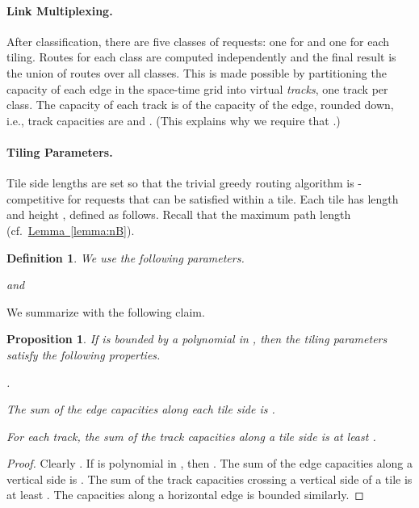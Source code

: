 \documentclass[11pt]{article}
\newtheorem{proposition}[theorem]{Proposition}
\newcommand{\namedref}[2]{\hyperref[#2]{#1~\ref*{#2}}}
\newcommand{\lemmaref}[1]{\namedref{Lemma}{#1}}
\newtheorem{defn}[theorem]{Definition}
\newenvironment{proof sketch}[1]{\noindent {\emph{Proof sketch of #1:}}}{\hfill \qed}
\newcommand{\near}{\text{\emph{Near}}\xspace}
\begin{document}
\paragraph{Link Multiplexing\ifnum{}.\fi}
After classification, there are five classes of
requests: one for \near and one for each tiling. Routes for each class
are computed independently and the final result is the union of routes
over all classes. This is made possible by partitioning the capacity
of each edge in the space-time
grid into virtual \emph{tracks}, one track per class.  The capacity of each
track is  of the capacity of the edge, rounded
down, i.e., track capacities are  and
{}.  (This explains why
we require that .)

\paragraph{Tiling Parameters\ifnum{}.\fi}
Tile side lengths are set so that the trivial greedy routing algorithm
is -competitive for requests that can be satisfied within a
tile. Each tile
has length  and height , defined as follows.
Recall that the maximum path length  (cf.~\lemmaref{lemma:nB}).
\begin{defn}\label{def:xy}
We use the following parameters.
\begin{compactitem}
\item 
\item  and 
\end{compactitem}
\end{defn}
\noindent
We summarize with the following claim.


\begin{proposition}\label{prop:tiling}
If  is bounded by a polynomial in , then the tiling parameters
satisfy the following properties.
  \begin{compactenum}
  \item .
  \item The sum of the edge capacities along each tile side is .
  \item For each track, the sum of the track capacities along a tile side is at least .
\end{compactenum}
\end{proposition}

\begin{proof}
  Clearly . If  is polynomial in , then
  .  The sum of the edge capacities along a vertical side
  is .  The sum of the track capacities
  crossing a vertical side of a tile is at least . The capacities along a horizontal edge is bounded similarly.
\end{proof}
\end{document}
